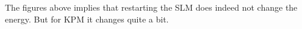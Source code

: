 
The figures above implies that restarting the SLM does indeed not change the energy. But for KPM it changes quite a bit. 


